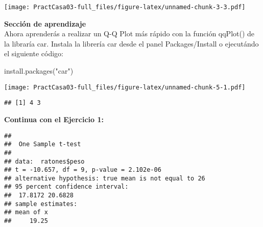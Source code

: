 \documentclass[
]{article}
\newenvironment{Shaded}{}{}
\newcommand{\AttributeTok}[1]{\textcolor[rgb]{0.49,0.56,0.16}{#1}}
\newcommand{\CommentTok}[1]{\textcolor[rgb]{0.38,0.63,0.69}{\textit{#1}}}
\newcommand{\DecValTok}[1]{\textcolor[rgb]{0.25,0.63,0.44}{#1}}
\newcommand{\FunctionTok}[1]{\textcolor[rgb]{0.02,0.16,0.49}{#1}}
\newcommand{\NormalTok}[1]{#1}
\newcommand{\SpecialCharTok}[1]{\textcolor[rgb]{0.25,0.44,0.63}{#1}}
\newcommand{\StringTok}[1]{\textcolor[rgb]{0.25,0.44,0.63}{#1}}
\begin{document}
\texttt{[image: PractCasa03-full\_files/figure-latex/unnamed-chunk-3-3.pdf]}

\textbf{Sección de aprendizaje}\\
Ahora aprenderás a realizar un Q-Q Plot más rápido con la función
qqPlot() de la libraría car. Instala la librería car desde el panel
Packages/Install o ejecutándo el siguiente código:

\begin{Shaded}
\begin{Highlighting}[]
\FunctionTok{install.packages}\NormalTok{(}\StringTok{"car"}\NormalTok{)}
\end{Highlighting}
\end{Shaded}

\begin{Shaded}
\end{Shaded}

\texttt{[image: PractCasa03-full\_files/figure-latex/unnamed-chunk-5-1.pdf]}

\begin{verbatim}
## [1] 4 3
\end{verbatim}

\textbf{Continua con el Ejercicio 1:}

\begin{Shaded}
\end{Shaded}

\begin{verbatim}
## 
##  One Sample t-test
## 
## data:  ratones$peso
## t = -10.657, df = 9, p-value = 2.102e-06
## alternative hypothesis: true mean is not equal to 26
## 95 percent confidence interval:
##  17.8172 20.6828
## sample estimates:
## mean of x 
##     19.25
\end{verbatim}
\end{document}
